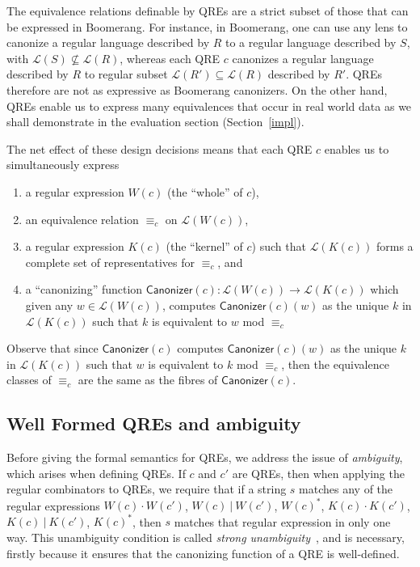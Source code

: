 \documentclass[acmsmall,review,anonymous]{acmart}\settopmatter{printfolios=true,printccs=false,printacmref=false}
\newcommand{\kw}[1]{\ensuremath{\mathsf{#1}}}
\newcommand{\sep}{\ensuremath{\ | \ }}
\newcommand{\canonizer}{\ensuremath{\kw{Canonizer}}}
\newcommand{\eqrel}[1]{\ensuremath{\equiv_{#1}}}
\begin{document}
The equivalence relations definable by QREs are a strict subset of those that
can be expressed in Boomerang. For instance, in Boomerang, one can use any lens
to canonize a regular language described by $R$ to a regular language described
by $S$, with $\mathcal{L}(S) \not \subseteq \mathcal{L}(R)$, whereas each QRE
$c$ canonizes a regular language described by $R$ to regular subset
$\mathcal{L}(R') \subseteq \mathcal{L}(R)$ described by $R'$. QREs therefore are
not as expressive as Boomerang canonizers. On the other hand, QREs enable us to
express many equivalences that occur in real world data as we shall demonstrate
in the evaluation section (Section~\ref{impl}).

The net effect of these design decisions means that each QRE $c$ enables
us to simultaneously express
\begin{enumerate}
  \item a regular expression $W(c)$ (the ``whole'' of $c$),
  \item an equivalence relation $\eqrel{c}$ on $\mathcal{L}(W(c))$,
  \item a regular expression $K(c)$ (the ``kernel'' of $c$)
  such that $\mathcal{L}(K(c))$ forms a complete set of representatives for
  $\eqrel{c}$, and
  \item a ``canonizing'' function $\canonizer(c):\mathcal{L}(W(c))
  \longrightarrow \mathcal{L}(K(c))$ which given any $w \in \mathcal{L}(W(c))$,
  computes $\canonizer(c)(w)$ as the unique $k$ in $\mathcal{L}(K(c))$ such that
  $k$ is equivalent to $w$ mod $\eqrel{c}$
\end{enumerate}
Observe that since $\canonizer(c)$ computes $\canonizer(c)(w)$ as the unique
$k$ in $\mathcal{L}(K(c))$ such that $w$ is equivalent to $k$ mod $\eqrel{c}$,
then the equivalence classes of $\eqrel{c}$ are the same as the fibres of
$\canonizer(c)$.

\subsection{Well Formed QREs and ambiguity}
Before giving the formal semantics for QREs, we address the issue of {\em
ambiguity}, which arises when defining QREs. If $c$ and  $c'$ are QREs, then
when applying the regular combinators to QREs, we require that if a string $s$
matches any of the regular expressions $W(c) \cdot W(c')$, $W(c) \sep W(c')$,
$W(c)^*$, $K(c) \cdot K(c')$, $K(c) \sep K(c')$, $K(c)^*$, then $s$ matches
that regular expression in only one way. This unambiguity condition is called
{\em strong unambiguity}~\cite{Sippu1988}, and is necessary, firstly because it
ensures that the canonizing function of a QRE is well-defined.
\end{document}
